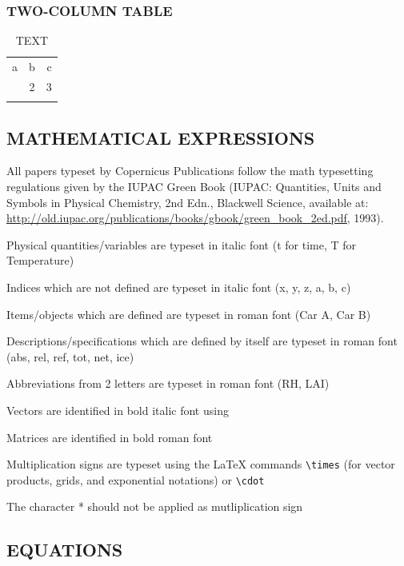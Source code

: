 \documentclass[gc, manuscript]{copernicus}
\begin{document}
\subsubsection{TWO-COLUMN TABLE}

\begin{table}[t]
\caption{TEXT}
\begin{tabular}{l c r}
\tophline

a & b & c \\
\middlehline
1 & 2 & 3 \\

\bottomhline
\end{tabular}
\end{table}

\subsection{MATHEMATICAL EXPRESSIONS}

All papers typeset by Copernicus Publications follow the math
typesetting regulations given by the IUPAC Green Book (IUPAC:
Quantities, Units and Symbols in Physical Chemistry, 2nd Edn., Blackwell
Science, available at:
\url{http://old.iupac.org/publications/books/gbook/green_book_2ed.pdf},
1993).

Physical quantities/variables are typeset in italic font (t for time, T
for Temperature)

Indices which are not defined are typeset in italic font (x, y, z, a, b,
c)

Items/objects which are defined are typeset in roman font (Car A, Car B)

Descriptions/specifications which are defined by itself are typeset in
roman font (abs, rel, ref, tot, net, ice)

Abbreviations from 2 letters are typeset in roman font (RH, LAI)

Vectors are identified in bold italic font using 

Matrices are identified in bold roman font

Multiplication signs are typeset using the LaTeX commands
\texttt{\textbackslash{}times} (for vector products, grids, and
exponential notations) or \texttt{\textbackslash{}cdot}

The character * should not be applied as mutliplication sign

\subsection{EQUATIONS}
\end{document}
